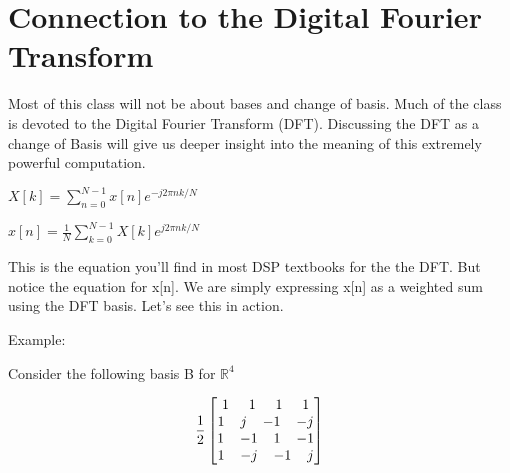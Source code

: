 \documentclass[11pt]{article}
\begin{document}
\section{Connection to the Digital Fourier Transform}

Most of this class will not be about bases and change of basis. Much of the class is devoted to the Digital Fourier Transform (DFT). Discussing the DFT as a change of Basis will give us deeper insight into the meaning of this extremely powerful computation. 

\vspace{2mm}
\begin{center}

$
X[k] =  \sum_{n = 0}^{N-1} x[n]  e^{-j 2\pi nk/N}
$

\end{center}
\vspace{3mm}
\begin{center}

$
x[n] =\frac{1}{{N}} \sum_{k = 0}^{N-1} X[k]  e^{j 2\pi nk/N}
$

\end{center}

\vspace{3mm}

This is the equation you'll find in most DSP textbooks for the the DFT. But notice the equation for x[n]. We are simply expressing x[n] as a weighted sum using the DFT basis. Let's see this in action.

Example:

Consider the following basis B for $\mathbb{R}^4$
\begin{center}

\[
\frac{1}{2}
\begin{bmatrix}
 1\hspace{5mm} 1\hspace{5mm} 1 \hspace{5mm}1\\
 1\hspace{4mm} j\hspace{4mm} {-1}\hspace{4mm} {-j} \\
1 \hspace{4mm}{-1}\hspace{4mm} 1 \hspace{4mm}{-1}\\
1\hspace{4mm} {-j}\hspace{4mm} {-1}\hspace{4mm} j
\end{bmatrix}
\]

\end{center}
\end{document}
